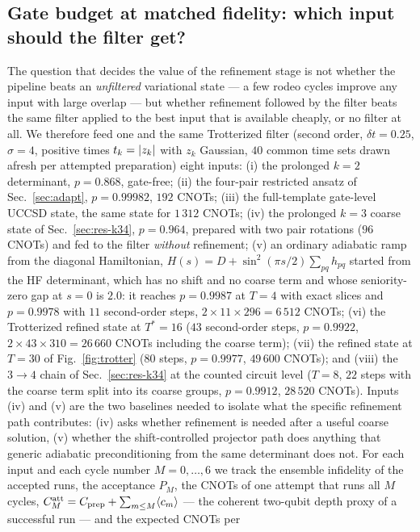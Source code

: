 \documentclass[
  aps,            %
  prc,            %
  reprint,        %
  superscriptaddress,
  floatfix,
  nofootinbib
]{revtex4-2}
\begin{document}
\subsection{Gate budget at matched fidelity: which input should the filter get?}
\label{sec:depth}
The question that decides the value of the refinement stage is not whether the
pipeline beats an \emph{unfiltered} variational state --- a few rodeo cycles
improve any input with large overlap --- but whether refinement followed by
the filter beats the same filter applied to the best input that is available
cheaply, or no filter at all.  We therefore feed one and the same Trotterized
filter (second order, $\delta t=0.25$, $\sigma=4$, positive times
$t_k=\abs{z_k}$ with $z_k$ Gaussian, $40$ common time sets drawn afresh per
attempted preparation) eight inputs: (i) the prolonged $k=2$ determinant, $p=0.868$, gate-free; (ii) the
four-pair restricted ansatz of Sec.~\ref{sec:adapt}, $p=0.99982$, $192$
CNOTs; (iii) the full-template gate-level UCCSD state, the same state for
$1\,312$ CNOTs; (iv) the prolonged $k=3$ coarse state of
Sec.~\ref{sec:res-k34}, $p=0.964$, prepared with two pair rotations ($96$
CNOTs) and fed to the filter \emph{without} refinement; (v) an ordinary
adiabatic ramp from the diagonal Hamiltonian,
$H(s)=D+\sin^2(\pi s/2)\sum_{pq}h_{pq}$ started from the HF determinant,
which has no shift and no coarse term and whose seniority-zero gap at $s=0$
is $2.0$: it reaches $p=0.9987$ at $T=4$ with exact slices and $p=0.9978$
with $11$ second-order steps, $2\times11\times296=6\,512$ CNOTs; (vi) the
Trotterized refined state at $T^{*}=16$ ($43$ second-order steps,
$p=0.9922$, $2\times43\times310=26\,660$ CNOTs including the coarse term);
(vii) the refined state at $T=30$ of Fig.~\ref{fig:trotter} ($80$ steps,
$p=0.9977$, $49\,600$ CNOTs); and (viii) the $3\to4$ chain of
Sec.~\ref{sec:res-k34} at the counted circuit level ($T=8$, $22$ steps with
the coarse term split into its coarse groups, $p=0.9912$, $28\,520$ CNOTs).
Inputs (iv) and (v) are the two baselines needed to isolate what the
specific refinement path contributes: (iv) asks whether refinement is needed
after a useful coarse solution, (v) whether the shift-controlled projector
path does anything that generic adiabatic preconditioning from the same
determinant does not.  For each input and each cycle number $M=0,\ldots,6$
we track the ensemble infidelity of the accepted runs, the acceptance $P_M$,
the CNOTs of one attempt that runs all $M$ cycles,
$C^{\rm att}_M=C_{\rm prep}+\sum_{m\le M}\langle c_m\rangle$ --- the coherent
two-qubit depth proxy of a successful run --- and the expected CNOTs per
\end{document}
